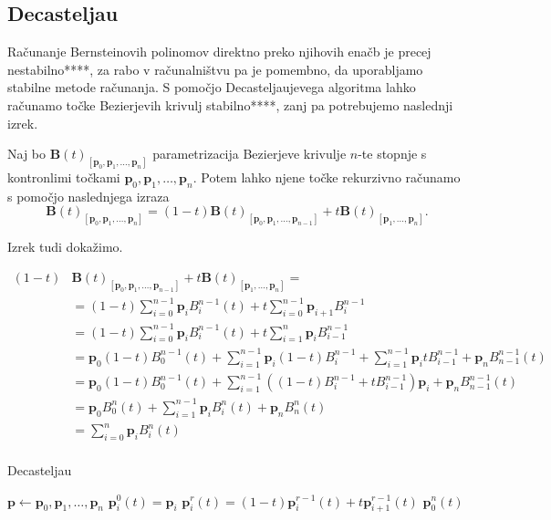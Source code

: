 \documentclass[isrm2, tisk]{fmfdelo}
\newcommand{\p}{\textbf{p}}
\newcommand{\lilb}[2]{B_{#1}^{#2}(t)}
\newcommand{\bigbbt}{\textbf{B}(t)}
\newcommand{\bernsteinsump}[2]{\sum_{#1=0}^{#2} \p_{#1}\lilb{#1}{#2}}
\begin{document}
    \subsection{Decasteljau}
    Računanje Bernsteinovih polinomov direktno preko njihovih enačb je precej nestabilno****, za rabo v računalništvu pa je pomembno, da uporabljamo stabilne metode računanja.
    S pomočjo Decasteljaujevega algoritma lahko računamo točke Bezierjevih krivulj stabilno****, zanj pa potrebujemo naslednji izrek.
    \begin{izrek}
        Naj bo $\bigbbt_{[\p_0,\p_1,\dots,\p_n]}$ parametrizacija Bezierjeve krivulje $n$-te stopnje s kontronlimi točkami $\p_0,\p_1,\dots,\p_n$.
        Potem lahko njene točke rekurzivno računamo s pomočjo naslednjega izraza \[\bigbbt_{[\p_0,\p_1,\dots,\p_n]} = (1-t)\bigbbt_{[\p_0,\p_1,\dots,\p_{n-1}]} +t\bigbbt_{[\p_1,\dots,\p_n]}.\]
    \end{izrek}
    Izrek tudi dokažimo.
    \begin{dokaz}
        \begin{align*}
        (1-t)
            &
            \bigbbt_{[\p_0,\p_1,\dots,\p_{n-1}]}+t\bigbbt_{[\p_1,\dots,\p_n]} = \\
            &= (1-t)\bernsteinsump{i}{n-1}+t\sum_{i=0}^{n-1} \p_{i+1}B_i^{n-1} \\
            &= (1-t)\bernsteinsump{i}{n-1}+ t\sum_{i=1}^{n} \p_{i}B_{i-1}^{n-1} \\
            &= \p_0(1-t)B_{0}^{n-1}(t) + \sum_{i=1}^{n-1}\p_{i}(1-t)B_i^{n-1} +  \sum_{i=1}^{n-1} \p_{i}tB_{i-1}^{n-1} + \p_n B_{n-1}^{n-1}(t) \\
            &= \p_0(1-t)B_{0}^{n-1}(t) + \sum_{i=1}^{n-1}\left((1-t)B_i^{n-1} + tB_{i-1}^{n-1}\right)\p_{i} + \p_n B_{n-1}^{n-1}(t) \\
            &= \p_0B_{0}^{n}(t) + \sum_{i=1}^{n-1}\p_{i}B_i^n(t) + \p_n B_{n}^{n}(t) \\
            &= \sum_{i=0}^{n}\p_{i}B_i^n(t) \\
        \end{align*}
    \end{dokaz}
    \begin{algorithm}
        \label{alg:decasteljau}
        \caption{Decasteljau}
        \begin{algorithmic}
            \State $\p \gets \p_0,\p_1,\dots,\p_n$
                \State $\p_i^0(t)=\p_i$
            \EndFor
                    \State $\p_i^r(t)=(1-t)\p_i^{r-1}(t)+t\p_{i+1}^{r-1}(t)$
                \EndFor
            \EndFor
            \State \Return $\p_0^n(t)$
        \end{algorithmic}
    \end{algorithm}
\end{document}

